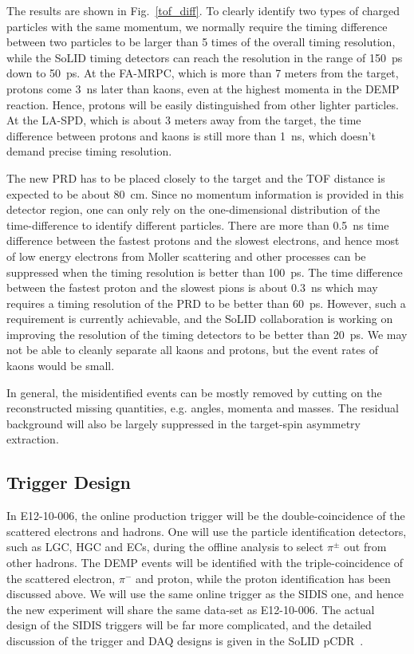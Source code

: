 The results are shown in Fig.~\ref{tof_diff}. To clearly identify two types of
charged particles with the same momentum, we normally require the timing
difference between two particles to be larger than 5 times of the overall
timing resolution, while the SoLID timing detectors can reach the resolution
in the range of 150~ps down to 50~ps.  At the FA-MRPC, which is more than 7
meters from the target, protons come 3~ns later than kaons, even at the
highest momenta in the DEMP reaction. Hence, protons will be easily distinguished
from other lighter particles.  At the LA-SPD, which is about 3 meters away from
the target, the time difference between protons and kaons is still more than
1~ns, which doesn't demand precise timing resolution.

The new PRD has to be placed closely to the target and the TOF distance is
expected to be about 80~cm. Since no momentum information is provided in this
detector region, one can only rely on the one-dimensional distribution of the
time-difference to identify different particles. There are more than 0.5~ns
time difference between the fastest protons and the slowest electrons, and
hence most of low energy electrons from Moller scattering and other processes
can be suppressed when the timing resolution is better than 100~ps. The time
difference between the fastest proton and the slowest pions is about 0.3~ns
which may requires a timing resolution of the PRD to be better than 60~ps.
However, such a requirement is currently achievable, and the SoLID
collaboration is working on improving the resolution of the timing detectors to
be better than 20~ps. We may not be able to cleanly separate all kaons and
protons, but the event rates of kaons would be small.

In general, the misidentified events can be mostly removed by cutting on the
reconstructed missing quantities, e.g. angles, momenta and masses. The residual
background will also be largely suppressed in the target-spin asymmetry
extraction.

\subsection{Trigger Design}
In E12-10-006, the online production trigger will be the double-coincidence of
the scattered electrons and hadrons. One will use the particle identification
detectors, such as LGC, HGC and ECs, during the offline analysis to select
$\pi^{\pm}$ out from other hadrons. The DEMP events will be identified with the
triple-coincidence of the scattered electron, $\pi^{-}$ and proton, while the
proton identification has been discussed above. We will use the same online
trigger as the SIDIS one, and hence the new experiment will share the same
data-set as E12-10-006. The actual design of the SIDIS triggers will be far
more complicated, and the detailed discussion of the trigger and DAQ designs is
given in the SoLID pCDR~\cite{solid_pcdr}.

